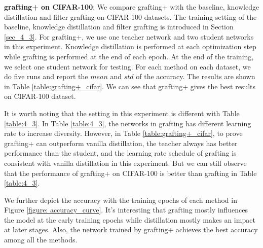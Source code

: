 \documentclass{article}
\begin{document}
\textbf{grafting+ on CIFAR-100}: We compare grafting+ with the baseline, knowledge distillation and filter grafting on CIFAR-100 datasets. The training setting of the baseline, knowledge distillation and filter grafting is introduced in Section \ref{sec_4_3}. For grafting+, we use one teacher network and two student networks in this experiment. Knowledge distillation is performed at each optimization step while grafting is performed at the end of each epoch. At the end of the training, we select one student network for testing. For each method on each dataset, we do five runs and report the $mean$ and $std$ of the accuracy. The results are shown in Table \ref{table:grafting+_cifar}. We can see that grafting+ gives the best results on CIFAR-100 dataset. 

It is worth noting that the setting in this experiment is different with Table \ref{table:4_3}. In Table \ref{table:4_3}, the networks in grafting has different learning rate to increase diversity. However, in Table \ref{table:grafting+_cifar}, to prove grafting+ can outperform vanilla distillation, the teacher always has better performance than the student, and the learning rate schedule of grafting is consistent with vanilla distillation in this experiment. But we can still observe that the performance of grafting+ on CIFAR-100 is better than grafting in Table \ref{table:4_3}. 

We further depict the accuracy with the training epochs of each method in Figure \ref{figure: accuracy_curve}. It's interesting that grafting mostly influences the model at the early training epochs while distillation mostly makes an impact at later stages. Also, the network trained by grafting+ achieves the best accuracy among all the methods. 
\end{document}
